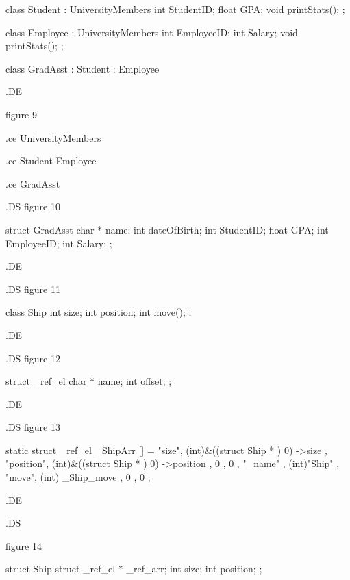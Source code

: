 class Student : UniversityMembers
    {
	int	StudentID;
   	float	GPA;
	void	printStats();
    }	;

class Employee : UniversityMembers
    {
	int	EmployeeID;
	int	Salary;
	void	printStats();
    }	;

class GradAsst : Student : Employee

.DE




figure 9


.ce
UniversityMembers





.ce
Student			Employee





.ce
GradAsst







.DS
figure 10

struct GradAsst
    {
	char *	name;
	int	dateOfBirth;
	int	StudentID;
   	float	GPA;
	int	EmployeeID;
	int	Salary;
    }	;

.DE





.DS
figure 11

class Ship
    {
	int	size;
	int	position;
	int	move();
    }	;


.DE





.DS
figure 12


struct _ref_el
    {
	char * name; 
	int offset; 
    };


.DE






.DS
figure 13

static struct _ref_el _ShipArr [] =
    { 
	{ "size",	(int)&((struct Ship * ) 0) ->size },
	{ "position",	(int)&((struct Ship * ) 0) ->position },
	{ 0 , 0 },
	{ "_name" , (int)"Ship" },
	{ "move",	(int) _Ship_move },
	{  0 , 0 }
    };	


.DE






.DS

figure 14

struct Ship
    {
	struct _ref_el * _ref_arr;
	int	size;
	int	position;
    }	;



